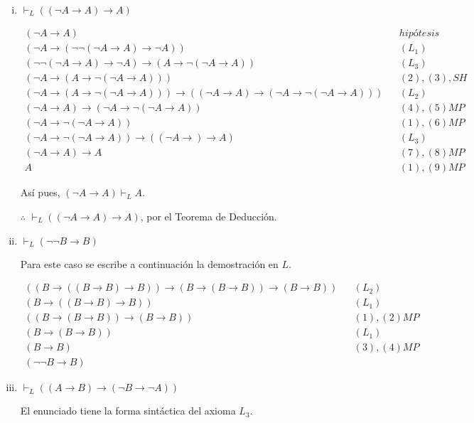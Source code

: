 \documentclass[osajnl,twocolumn,showpacs,superscriptaddress,10pt,leqno]{revtex4-1} %
\begin{document}
\begin{enumerate}[i.]
    \item $\vdash_L ((\neg A \rightarrow A) \rightarrow A)$

    \begin{align}
        (\neg A \rightarrow A) && hipótesis \\
        (\neg A \rightarrow (\neg \neg (\neg A \rightarrow A) \rightarrow \neg A)) && (L_{1}) \\
        (\neg \neg (\neg A \rightarrow A) \rightarrow \neg A) \rightarrow (A \rightarrow \neg (\neg A \rightarrow A)) && (L_{3}) \\
        (\neg A \rightarrow (A \rightarrow \neg (\neg A \rightarrow A))) && (2), (3), SH \\
        (\neg A \rightarrow (A \rightarrow \neg (\neg A \rightarrow A))) \rightarrow ((\neg A \rightarrow A) \rightarrow (\neg A \rightarrow \neg (\neg A \rightarrow A))) && (L_{2}) \\
        (\neg A \rightarrow A) \rightarrow (\neg A \rightarrow \neg (\neg A \rightarrow A)) && (4), (5) MP \\
        (\neg A \rightarrow \neg (\neg A \rightarrow A)) && (1), (6) MP \\
        (\neg A \rightarrow \neg (\neg A \rightarrow A)) \rightarrow ((\neg A \rightarrow) \rightarrow A) && (L_{3}) \\
        (\neg A \rightarrow A) \rightarrow A && (7), (8) MP \\
        A && (1), (9) MP
    \end{align}

    Así pues, $(\neg A \rightarrow A) \vdash_L A$.
    
    $\therefore$ $\vdash_L ((\neg A \rightarrow A) \rightarrow A)$, por el Teorema de Deducción.

    \item $\vdash_L (\neg \neg B \rightarrow B)$

    Para este caso se escribe a continuación la demostración en $L$.

    \begin{align}
        ((B \rightarrow ((B \rightarrow B) \rightarrow B)) \rightarrow (B \rightarrow (B \rightarrow B)) \rightarrow (B \rightarrow B)) && (L_{2}) \\
        (B \rightarrow ((B \rightarrow B) \rightarrow B)) && (L_{1}) \\
        ((B \rightarrow (B \rightarrow B)) \rightarrow (B \rightarrow B)) && (1), (2) MP \\
        (B \rightarrow (B \rightarrow B)) && (L_{1}) \\
        (B \rightarrow B) && (3), (4) MP \\
        (\neg \neg B \rightarrow B)
    \end{align}    

    \item $\vdash_L ((A \rightarrow B) \rightarrow (\neg B \rightarrow \neg A))$

    El enunciado tiene la forma sintáctica del axioma $L_{3}$.
\end{enumerate}
\end{document}
